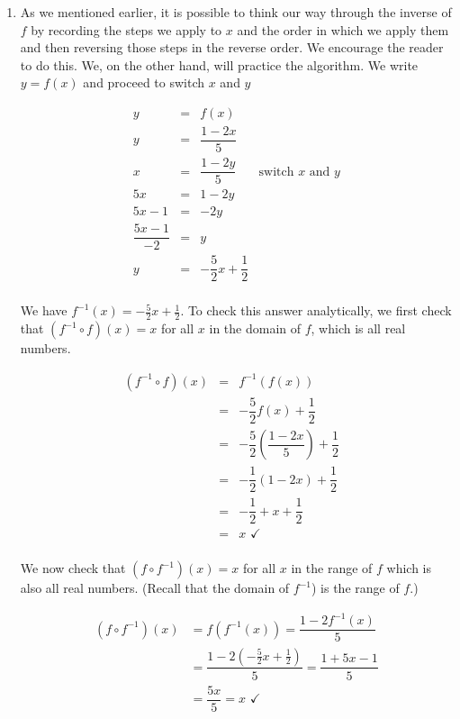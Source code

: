 {
\begin{enumerate}

\item  As we mentioned earlier, it is possible to think our way through the inverse of $f$ by recording the steps we apply to $x$ and the order in which we apply them and then reversing those steps in the reverse order.  We encourage the reader to do this.  We, on the other hand, will practice the algorithm.  We write $y=f(x)$ and proceed to switch $x$ and $y$

\[ \begin{array}{rclr}

y & = & f(x) & \\ [3pt]
y & = &  \dfrac{1-2x}{5} & \\ [6pt]
x & = & \dfrac{1-2y}{5} & \mbox{switch $x$ and $y$} \\ [6pt]
5x & = & 1 - 2y & \\
5x-1 & = & -2y & \\ 
\dfrac{5x-1}{-2} & = & y & \\ 
y & = & -\dfrac{5}{2} x + \dfrac{1}{2} & \\
\end{array} \]

We have $f^{-1}(x) = -\frac{5}{2} x + \frac{1}{2}$.  To check this answer analytically, we first check that $\left(f^{-1} \circ f \right)(x) = x $ for all $x$ in the domain of $f$, which is all real numbers.

\[ \begin{array}{rclr}
\left(f^{-1} \circ f \right)(x) & = & f^{-1}(f(x)) & \\ 
& = & -\dfrac{5}{2} f(x) + \dfrac{1}{2} & \\ [6pt]
& = & -\dfrac{5}{2} \left(\dfrac{1-2x}{5}\right) + \dfrac{1}{2} & \\ 
& = & -\dfrac{1}{2} (1-2x) + \dfrac{1}{2} & \\ [6pt]
& = & -\dfrac{1}{2} + x + \dfrac{1}{2} & \\ 
& = & x \, \, \checkmark \\

\end{array}\]

We now check that $\left(f \circ f^{-1} \right)(x) = x $ for all $x$ in the range of $f$ which is also all real numbers.  (Recall that the domain of $f^{-1}$) is the range of $f$.)

\begin{align*}
\left(f \circ f^{-1} \right)(x) & =  f(f^{-1}(x)) = \dfrac{1-2f^{-1}(x)}{5}  \\
& = \dfrac{1-2\left(  -\frac{5}{2} x + \frac{1}{2} \right)}{5}  = \dfrac{1+5x-1}{5} \\ 
& = \dfrac{5x}{5}  = x \, \, \checkmark
\end{align*}


\end{enumerate}}
